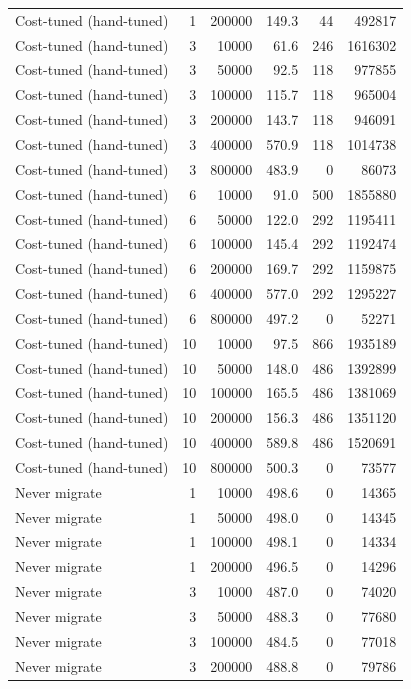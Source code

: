 \begin{table}[h]
\begin{tabular}{@{}lrrrrr@{}}
Cost-tuned (hand-tuned) & 1 & 200000 & 149.3 & 44 & 492817 \\
Cost-tuned (hand-tuned) & 3 & 10000 & 61.6 & 246 & 1616302 \\
Cost-tuned (hand-tuned) & 3 & 50000 & 92.5 & 118 & 977855 \\
Cost-tuned (hand-tuned) & 3 & 100000 & 115.7 & 118 & 965004 \\
Cost-tuned (hand-tuned) & 3 & 200000 & 143.7 & 118 & 946091 \\
Cost-tuned (hand-tuned) & 3 & 400000 & 570.9 & 118 & 1014738 \\
Cost-tuned (hand-tuned) & 3 & 800000 & 483.9 & 0 & 86073 \\
Cost-tuned (hand-tuned) & 6 & 10000 & 91.0 & 500 & 1855880 \\
Cost-tuned (hand-tuned) & 6 & 50000 & 122.0 & 292 & 1195411 \\
Cost-tuned (hand-tuned) & 6 & 100000 & 145.4 & 292 & 1192474 \\
Cost-tuned (hand-tuned) & 6 & 200000 & 169.7 & 292 & 1159875 \\
Cost-tuned (hand-tuned) & 6 & 400000 & 577.0 & 292 & 1295227 \\
Cost-tuned (hand-tuned) & 6 & 800000 & 497.2 & 0 & 52271 \\
Cost-tuned (hand-tuned) & 10 & 10000 & 97.5 & 866 & 1935189 \\
Cost-tuned (hand-tuned) & 10 & 50000 & 148.0 & 486 & 1392899 \\
Cost-tuned (hand-tuned) & 10 & 100000 & 165.5 & 486 & 1381069 \\
Cost-tuned (hand-tuned) & 10 & 200000 & 156.3 & 486 & 1351120 \\
Cost-tuned (hand-tuned) & 10 & 400000 & 589.8 & 486 & 1520691 \\
Cost-tuned (hand-tuned) & 10 & 800000 & 500.3 & 0 & 73577 \\
Never migrate & 1 & 10000 & 498.6 & 0 & 14365 \\
Never migrate & 1 & 50000 & 498.0 & 0 & 14345 \\
Never migrate & 1 & 100000 & 498.1 & 0 & 14334 \\
Never migrate & 1 & 200000 & 496.5 & 0 & 14296 \\
Never migrate & 3 & 10000 & 487.0 & 0 & 74020 \\
Never migrate & 3 & 50000 & 488.3 & 0 & 77680 \\
Never migrate & 3 & 100000 & 484.5 & 0 & 77018 \\
Never migrate & 3 & 200000 & 488.8 & 0 & 79786 \\

\end{tabular}
\end{table}
